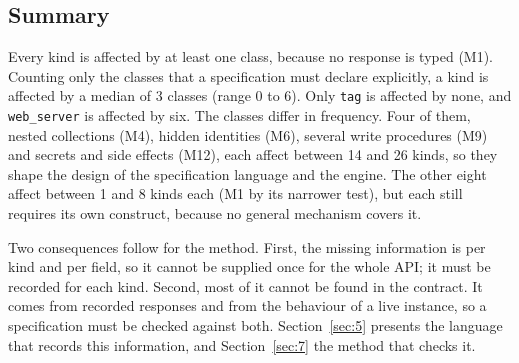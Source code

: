 \subsection{Summary}\label{sec:3.4}

Every kind is affected by at least one class, because no response is typed (M1). Counting only the
classes that a specification must declare explicitly, a kind is affected by a median of 3 classes
(range 0 to 6). Only \texttt{tag} is affected by none, and \texttt{web\_server} is affected by six. The classes
differ in frequency. Four of them, nested collections (M4), hidden identities (M6), several write
procedures (M9) and secrets and side effects (M12), each affect between 14 and 26 kinds, so they
shape the design of the specification language and the engine. The other eight affect between 1 and
8 kinds each (M1 by its narrower test), but each still requires its own construct, because no
general mechanism covers it.

Two consequences follow for the method. First, the missing information is per kind and per field, so
it cannot be supplied once for the whole API; it must be recorded for each kind. Second, most of it
cannot be found in the contract. It comes from recorded responses and from the behaviour of a live
instance, so a specification must be checked against both. Section~\ref{sec:5} presents the language that
records this information, and Section~\ref{sec:7} the method that checks it.
